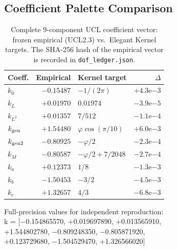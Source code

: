 \documentclass[11pt]{article}
\theoremstyle{remark}
\begin{document}
\begin{appendices}
\section{Coefficient Palette Comparison}
\label{app:palette}

\begin{table}[H]
\centering
\caption{Complete 9-component UCL coefficient vector: frozen empirical (UCL2.3) vs.\ Elegant Kernel targets.
The SHA-256 hash of the empirical vector is recorded in \texttt{dof\_ledger.json}.}
\label{tab:palette_deltas}
\renewcommand{\arraystretch}{1.05}
\footnotesize
\setlength{\tabcolsep}{3pt}
\begin{tabular}{@{}l r l r@{}}
\toprule
\textbf{Coeff.} & \textbf{Empirical} & \textbf{Kernel target} & \textbf{$\Delta$} \\
\midrule
$k_0$          & $-0.15487$ & $-1/(2\pi)$         & $+4.3\mathrm{e}{-3}$ \\
$k_L$          & $+0.01970$ & $0.01974$            & $-3.9\mathrm{e}{-5}$ \\
$k_{L^2}$      & $+0.01357$ & $7/512$              & $-1.1\mathrm{e}{-4}$ \\
$k_{\rm gen}$  & $+1.54480$ & $\varphi\cos(\pi/10)$ & $+6.0\mathrm{e}{-3}$ \\
$k_{\rm gen2}$ & $-0.80925$ & $-\varphi/2$         & $-2.3\mathrm{e}{-4}$ \\
$k_M$          & $-0.80587$ & $-\varphi/2{+}7/2048$& $-2.7\mathrm{e}{-4}$ \\
$k_a$          & $+0.12373$ & $1/8$                & $-1.3\mathrm{e}{-3}$ \\
$k_b$          & $-1.50453$ & $-3/2$               & $-4.5\mathrm{e}{-3}$ \\
$k_c$          & $+1.32657$ & $4/3$                & $-6.8\mathrm{e}{-3}$ \\
\bottomrule
\end{tabular}

\medskip
\noindent Full-precision values for independent reproduction:\\
{\ttfamily\scriptsize
\noindent k = [$-$0.154865570, +0.019697890, +0.013565910,\\
\phantom{k = [}+1.544802780, $-$0.809248350, $-$0.805871920,\\
\phantom{k = [}+0.123729680, $-$1.504529470, +1.326566020]}
\end{table}


\end{appendices}
\end{document}
